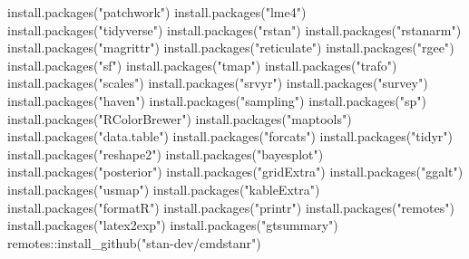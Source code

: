 \documentclass[
  letterpaper,
  DIV=11,
  numbers=noendperiod]{scrartcl}
\newenvironment{Shaded}{\begin{snugshade}}{\end{snugshade}}
\newcommand{\FunctionTok}[1]{\textcolor[rgb]{0.28,0.35,0.67}{#1}}
\newcommand{\NormalTok}[1]{\textcolor[rgb]{0.00,0.23,0.31}{#1}}
\newcommand{\SpecialCharTok}[1]{\textcolor[rgb]{0.37,0.37,0.37}{#1}}
\newcommand{\StringTok}[1]{\textcolor[rgb]{0.13,0.47,0.30}{#1}}
\begin{document}
\begin{Shaded}
\begin{Highlighting}[]
\FunctionTok{install.packages}\NormalTok{(}\StringTok{"patchwork"}\NormalTok{)}
\FunctionTok{install.packages}\NormalTok{(}\StringTok{"lme4"}\NormalTok{)}
\FunctionTok{install.packages}\NormalTok{(}\StringTok{"tidyverse"}\NormalTok{)}
\FunctionTok{install.packages}\NormalTok{(}\StringTok{"rstan"}\NormalTok{)}
\FunctionTok{install.packages}\NormalTok{(}\StringTok{"rstanarm"}\NormalTok{)}
\FunctionTok{install.packages}\NormalTok{(}\StringTok{"magrittr"}\NormalTok{)}
\FunctionTok{install.packages}\NormalTok{(}\StringTok{"reticulate"}\NormalTok{) }
\FunctionTok{install.packages}\NormalTok{(}\StringTok{"rgee"}\NormalTok{) }
\FunctionTok{install.packages}\NormalTok{(}\StringTok{"sf"}\NormalTok{)}
\FunctionTok{install.packages}\NormalTok{(}\StringTok{"tmap"}\NormalTok{)}
\FunctionTok{install.packages}\NormalTok{(}\StringTok{"trafo"}\NormalTok{)}
\FunctionTok{install.packages}\NormalTok{(}\StringTok{"scales"}\NormalTok{)}
\FunctionTok{install.packages}\NormalTok{(}\StringTok{"srvyr"}\NormalTok{)}
\FunctionTok{install.packages}\NormalTok{(}\StringTok{"survey"}\NormalTok{)}
\FunctionTok{install.packages}\NormalTok{(}\StringTok{"haven"}\NormalTok{)}
\FunctionTok{install.packages}\NormalTok{(}\StringTok{"sampling"}\NormalTok{)}
\FunctionTok{install.packages}\NormalTok{(}\StringTok{"sp"}\NormalTok{)}
\FunctionTok{install.packages}\NormalTok{(}\StringTok{"RColorBrewer"}\NormalTok{)}
\FunctionTok{install.packages}\NormalTok{(}\StringTok{"maptools"}\NormalTok{)}
\FunctionTok{install.packages}\NormalTok{(}\StringTok{"data.table"}\NormalTok{)}
\FunctionTok{install.packages}\NormalTok{(}\StringTok{"forcats"}\NormalTok{)}
\FunctionTok{install.packages}\NormalTok{(}\StringTok{"tidyr"}\NormalTok{)}
\FunctionTok{install.packages}\NormalTok{(}\StringTok{"reshape2"}\NormalTok{)}
\FunctionTok{install.packages}\NormalTok{(}\StringTok{"bayesplot"}\NormalTok{)}
\FunctionTok{install.packages}\NormalTok{(}\StringTok{"posterior"}\NormalTok{)}
\FunctionTok{install.packages}\NormalTok{(}\StringTok{"gridExtra"}\NormalTok{)}
\FunctionTok{install.packages}\NormalTok{(}\StringTok{"ggalt"}\NormalTok{)}
\FunctionTok{install.packages}\NormalTok{(}\StringTok{"usmap"}\NormalTok{)}
\FunctionTok{install.packages}\NormalTok{(}\StringTok{"kableExtra"}\NormalTok{)}
\FunctionTok{install.packages}\NormalTok{(}\StringTok{"formatR"}\NormalTok{)}
\FunctionTok{install.packages}\NormalTok{(}\StringTok{"printr"}\NormalTok{)}
\FunctionTok{install.packages}\NormalTok{(}\StringTok{"remotes"}\NormalTok{)}
\FunctionTok{install.packages}\NormalTok{(}\StringTok{"latex2exp"}\NormalTok{)}
\FunctionTok{install.packages}\NormalTok{(}\StringTok{"gtsummary"}\NormalTok{)}
\NormalTok{remotes}\SpecialCharTok{::}\FunctionTok{install\_github}\NormalTok{(}\StringTok{"stan{-}dev/cmdstanr"}\NormalTok{)}
\end{Highlighting}
\end{Shaded}
\end{document}

